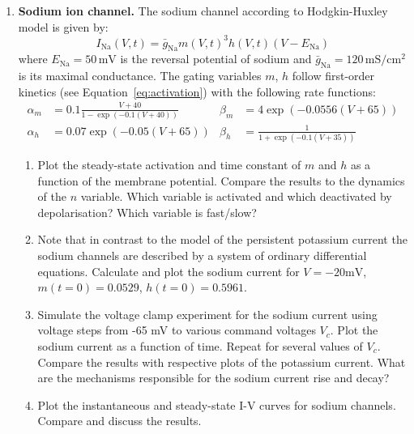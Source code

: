 \documentclass[12pt]{article}
\newcommand{\Na}{\text{Na}}
\begin{document}
\begin{enumerate}
\item \textbf{Sodium ion channel.} The sodium channel according
    to Hodgkin-Huxley model is given by:
    \begin{equation}
        I_{\Na}(V,t)=\bar{g}_{\Na}m(V,t)^3h(V,t)(V-E_{\Na})
    \end{equation}
    where $E_{\Na}=50\,\mathrm{mV}$ is the reversal potential of sodium and
    $\bar{g}_{\Na}=120\,\mathrm{mS/cm^2}$ is its maximal conductance.
    The gating variables $m$, $h$ follow first-order kinetics (see
    Equation~\ref{eq:activation}) with the following rate functions:
    \begin{align}
        \alpha_m&=0.1\frac{V+40}{1-\exp(-0.1(V+40))} &
        \beta_m&=4\exp(-0.0556(V+65)) \\
        \alpha_h&=0.07\exp(-0.05(V+65)) &
        \beta_h&=\frac{1}{1+\exp(-0.1(V+35))}
        \label{eq:Na_gating}
    \end{align}

    \begin{enumerate}
    \item Plot the steady-state activation and time constant of $m$ and $h$ as
        a function of the membrane potential. Compare the results to the
        dynamics of the $n$ variable. Which variable is activated and which
        deactivated by depolarisation? Which variable is fast/slow?
    \item Note that in contrast to the model of the persistent potassium
        current the sodium channels are described by a system of
        ordinary differential equations.
        Calculate and plot the sodium current for $V=-20\text{mV}$,
        $m(t=0)=0.0529$, $h(t=0)=0.5961$.
    \item Simulate the voltage clamp experiment for the sodium current using
        voltage steps from -65 mV to various command voltages $V_c$. Plot the
        sodium current as a function of time. Repeat for several values of
        $V_c$. Compare the results with respective plots of the potassium
        current. What are the mechanisms responsible for the sodium current
        rise and decay?
    \item Plot the instantaneous and steady-state I-V curves for sodium
        channels. Compare and discuss the results.
\end{enumerate}


\end{enumerate}
\end{document}
